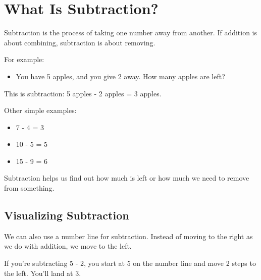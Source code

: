 \section{What Is Subtraction?}
Subtraction is the process of taking one number away from another. If addition is about combining, subtraction is about removing.

For example:
\begin{itemize}
    \item You have 5 apples, and you give 2 away. How many apples are left?
\end{itemize}
This is subtraction: 5 apples - 2 apples = 3 apples.

Other simple examples:
\begin{itemize}
    \item 7 - 4 = 3
    \item 10 - 5 = 5
    \item 15 - 9 = 6
\end{itemize}

Subtraction helps us find out how much is left or how much we need to remove from something.

\subsection{Visualizing Subtraction}
We can also use a number line for subtraction. Instead of moving to the right as we do with addition, we move to the left.

If you’re subtracting 5 - 2, you start at 5 on the number line and move 2 steps to the left. You’ll land at 3.

\begin{center}
\end{center}

